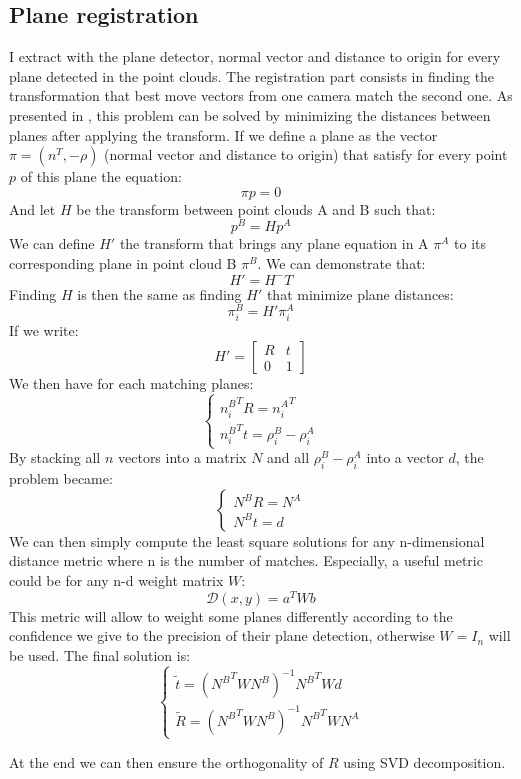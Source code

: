 \subsection{Plane registration}

I extract with the plane detector, normal vector and distance to origin for every plane detected in the point clouds. The registration part consists in finding the transformation that best move vectors from one camera match the second one. \newline
As presented in \cite{Khoshelham2016}, this problem can be solved by minimizing the distances between planes after applying the transform. \newline
If we define a plane as the vector $\pi=(n^T, -\rho)$ (normal vector and distance to origin) that satisfy for every point $p$ of this plane the equation:
\[\pi p=0\]
And let $H$ be the transform between point clouds A and B such that:
\[p^B = Hp^A\]
We can define $H'$ the transform that brings any plane equation in A $\pi^A$ to its corresponding plane in point cloud B $\pi^{B}$. We can demonstrate that: \[H'=H^-T\]
Finding $H$ is then the same as finding $H'$ that minimize plane distances: \[\pi^B_i=H'\pi^A_i\]
If we write: 
\[H'=\begin{bmatrix}
R & t\\ 
0 & 1
\end{bmatrix}\]
We then have for each matching planes:
\[\left\{\begin{matrix}
{n_i^B}^TR={n_i^A}^T\\ 
{n_i^B}^Tt=\rho_i^B-\rho_i^A
\end{matrix}\right.\]
By stacking all $n$ vectors into a matrix $N$ and all $\rho_i^B-\rho_i^A$ into a vector $d$, the problem became:
\[\left\{\begin{matrix}
N^BR=N^A\\ 
N^Bt=d
\end{matrix}\right.\]
We can then simply compute the least square solutions for any n-dimensional distance metric where n is the number of matches. Especially, a useful metric could be for any n-d weight matrix $W$:
\[\mathcal{D}(x,y)=a^TWb\]
This metric will allow to weight some planes differently according to the confidence we give to the precision of their plane detection, otherwise $W=I_n$ will be used.
The final solution is:
\[\left\{\begin{matrix}
\tilde{t}=({N^B}^TWN^B)^{-1}{N^B}^TWd\\ 
\tilde{R}=({N^B}^TWN^B)^{-1}{N^B}^TWN^A
\end{matrix}\right.\]

At the end we can then ensure the orthogonality of $R$ using SVD decomposition.